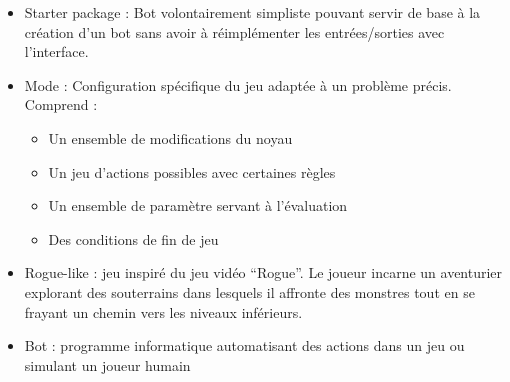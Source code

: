 \documentclass[12pt]{article}
\begin{document}
\begin{itemize}
	\item Starter package : Bot volontairement simpliste pouvant servir de base à la création d'un bot sans avoir à réimplémenter les entrées/sorties avec l'interface.
	\item Mode : Configuration spécifique du jeu adaptée à un problème précis. Comprend :
  	\begin{itemize}
		\item Un ensemble de modifications du noyau
		\item Un jeu d'actions possibles avec certaines règles
		\item Un ensemble de paramètre servant à l'évaluation
		\item Des conditions de fin de jeu
  	\end{itemize}
	\item Rogue-like : jeu inspiré du jeu vidéo ``Rogue''. Le joueur incarne un aventurier explorant des souterrains dans lesquels il affronte des monstres tout en se frayant un chemin vers les niveaux inférieurs.
	\item Bot : programme informatique automatisant des actions dans un jeu ou simulant un joueur humain
\end{itemize}
\end{document}
